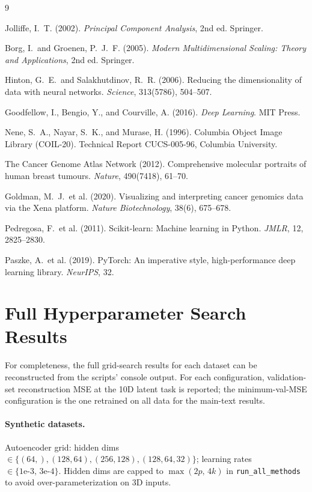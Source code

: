 \documentclass[11pt]{article}
\begin{document}
\begin{thebibliography}{9}

Jolliffe, I.\ T. (2002). \emph{Principal Component Analysis}, 2nd ed. Springer.

Borg, I.\ and Groenen, P.\ J.\ F. (2005). \emph{Modern Multidimensional Scaling: Theory and Applications}, 2nd ed. Springer.

Hinton, G.\ E.\ and Salakhutdinov, R.\ R. (2006). Reducing the dimensionality of data with neural networks. \emph{Science}, 313(5786), 504--507.

Goodfellow, I., Bengio, Y., and Courville, A. (2016). \emph{Deep Learning}. MIT Press.

Nene, S.\ A., Nayar, S.\ K., and Murase, H. (1996). Columbia Object Image Library (COIL-20). Technical Report CUCS-005-96, Columbia University.

The Cancer Genome Atlas Network (2012). Comprehensive molecular portraits of human breast tumours. \emph{Nature}, 490(7418), 61--70.

Goldman, M.\ J.\ et al. (2020). Visualizing and interpreting cancer genomics data via the Xena platform. \emph{Nature Biotechnology}, 38(6), 675--678.

Pedregosa, F.\ et al. (2011). Scikit-learn: Machine learning in Python. \emph{JMLR}, 12, 2825--2830.

Paszke, A.\ et al. (2019). PyTorch: An imperative style, high-performance deep learning library. \emph{NeurIPS}, 32.

\end{thebibliography}

\appendix
\section{Full Hyperparameter Search Results}

For completeness, the full grid-search results for each dataset can be reconstructed from the scripts' console output. For each configuration, validation-set reconstruction MSE at the 10D latent task is reported; the minimum-val-MSE configuration is the one retrained on all data for the main-text results.

\paragraph{Synthetic datasets.} Autoencoder grid: hidden dims $\in \{(64,), (128,64), (256,128), (128,64,32)\}$; learning rates $\in \{1\text{e-}3,\, 3\text{e-}4\}$. Hidden dims are capped to $\max(2p,\, 4k)$ in \texttt{run\_all\_methods} to avoid over-parameterization on 3D inputs.
\end{document}
